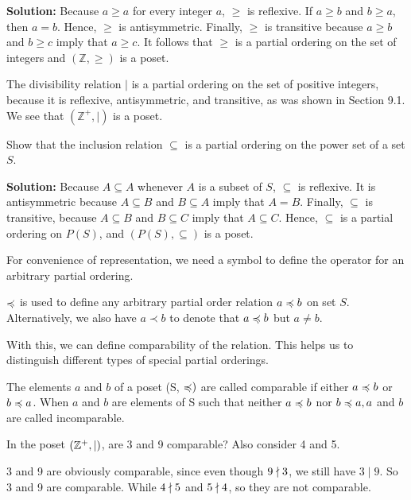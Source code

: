     \textbf{Solution:} Because $a \geq a$ for every integer $a$, $\geq$ is reflexive. If $a \geq b$ and $b \geq a$, then $a = b$. Hence, $\geq$ is antisymmetric. 
    Finally, $\geq$ is transitive because $a \geq b$ and $b \geq c$ imply that $a \geq c$. It follows that $\geq$ is a partial ordering on the set of integers and 
    $(\mathbb{Z}, \geq)$ is a poset.

\begin{example}
    The divisibility relation $|$ is a partial ordering on the set of positive integers, because it is reflexive, antisymmetric, and transitive, as was shown in Section 9.1. We see that $(\mathbb{Z}^+, |)$ is a poset.
\end{example}
        
\begin{example}
    Show that the inclusion relation $\subseteq$ is a partial ordering on the power set of a set $S$.
\end{example}
        
\textbf{Solution:} Because $A \subseteq A$ whenever $A$ is a subset of $S$, $\subseteq$ is reflexive. It is antisymmetric because $A \subseteq B$ and $B \subseteq A$ imply 
that $A = B$. Finally, $\subseteq$ is transitive, because $A \subseteq B$ and $B \subseteq C$ imply that $A \subseteq C$. Hence, $\subseteq$ is a partial ordering on $P(S)$, 
and $(P(S), \subseteq)$ is a poset.

For convenience of representation, we need a symbol to define the operator for an arbitrary partial ordering.
\begin{notation}
    $\preccurlyeq$ is used to define any arbitrary partial order relation $a \preccurlyeq b$ on set $S$.
    Alternatively, we also have $a \prec b$ to denote that $a\preccurlyeq b$ but $a \neq b$.
\end{notation}

With this, we can define comparability of the relation. This helps us to distinguish different types of special partial orderings.
\begin{definition}[Comparability]
    The elements $a$ and $b$ of a poset (S, $\preccurlyeq)$ are called comparable if either $a\preccurlyeq b$ or $b\preccurlyeq a$. When $a$ and $b$ are elements of S 
    such that neither $a\preccurlyeq b$ nor $b\preccurlyeq a,a$ and $b$ are called incomparable.
\end{definition}

\begin{example}
	In the poset $(\mathbb{Z}^+ ,\mid)$, are 3 and 9 comparable? Also consider 4 and 5.
\end{example}
\begin{solution}
	3 and 9 are obviously comparable, since even though $9 \nmid 3 $, we still have $3 \mid 9$. So 3 and 9 are comparable. While $4\nmid 5$ and $5\nmid 4$, so they are not comparable.
\end{solution}

